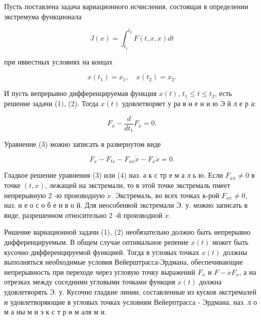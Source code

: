 \documentclass[10pt]{article}
\begin{document}
Пусть поставлена задача вариационного исчисления, состоящая в определении экстремума функционала



\[

J(x)=\int_{t_{1}}^{t_{2}} F(t, x, \dot{x}) d t

\]



при иввестных условиях на концах



\[

x\left(t_{1}\right)=x_{1}, \quad x\left(t_{2}\right)=x_{2} .

\]



И пусть вепрерывно дифференцируемая функция $x(t)$, $t_{1} \leqslant t \leqslant t_{2}$, есть решение задачи (1), (2). Тогда $x(t)$ удовлетворяет у ра в н е н и ю Э й л е р а:



\[

F_{x}-\frac{d}{d t_{1}} F_{\dot{x}}=0 .

\]



Уравнение (3) можно записать в развернутом виде



\[

F_{x}-F_{t \dot{x}}-F_{x \dot{x}} \dot{x}-F_{\dot{x}} \dot{x}=0 .

\]



Гладкое решение уравнения (3) или (4) наз. ә к с тр е м а л ь ю. Если $F_{\ddot{x} \dot{x}} \neq 0$ в точке $(t, x)$, лежащей на экстремали, то в этой точке экстремаль пмеет непрерывную 2 -ю производную $\ddot{x}$. Экстремаль, во всех точках к-рой $F_{\dot{x} \dot{x}} \neq 0$, наз. н е о с о б е н в о й. Для неособенвой экстремали Э. у. можно записать в виде, разрешенном относительно 2 -й производной $\ddot{x}$.



Рөшение вариационной задачи (1), (2) необязательно должно быть непрерывно дифференцируемым. В общем случае оптимальное репение $x(t)$ может быть кусочно дифференцируемой функцией. Тогда в угловых точках $x(t)$ должны выполняться необходимые условия Вейерштрасса-Эрдмана, обеспечивающие непрерывность при переходе через угловую точку выражений $F_{\dot{x}}$ и $F-\dot{x} F_{\dot{x}}$, а на отрезках между соседними угловыми точками функция $x(t)$ должна удовлетворять Э. у. Кусочно гладкие линии, составленные из кусков әкстремалей и удовлетворяющие в угловых точках условиям Вейерптрасса - Эрдмана, наз. л о м а ны м и э к с т р ө м аля м и.
\end{document}

